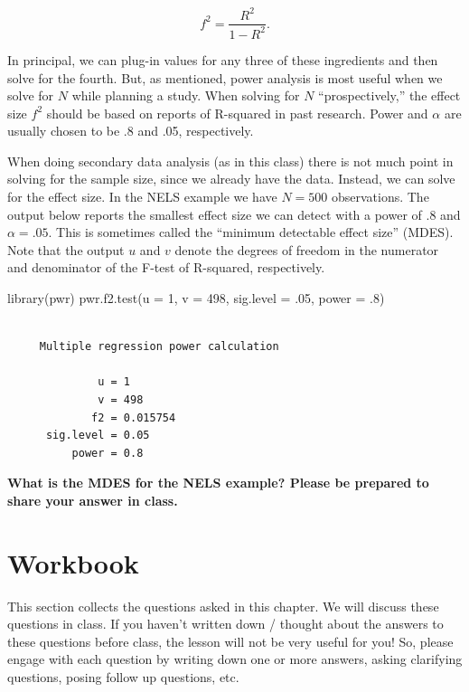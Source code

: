 \documentclass[
  letterpaper,
  DIV=11,
  numbers=noendperiod]{scrreprt}
\newenvironment{Shaded}{\begin{snugshade}}{\end{snugshade}}
\newcommand{\AttributeTok}[1]{\textcolor[rgb]{0.40,0.45,0.13}{#1}}
\newcommand{\DecValTok}[1]{\textcolor[rgb]{0.68,0.00,0.00}{#1}}
\newcommand{\FunctionTok}[1]{\textcolor[rgb]{0.28,0.35,0.67}{#1}}
\newcommand{\NormalTok}[1]{\textcolor[rgb]{0.00,0.23,0.31}{#1}}
\begin{document}
\[ f^2 = {\frac{R^2}{1-R^2}}. \]

In principal, we can plug-in values for any three of these ingredients
and then solve for the fourth. But, as mentioned, power analysis is most
useful when we solve for \(N\) while planning a study. When solving for
\(N\) ``prospectively,'' the effect size \(f^2\) should be based on
reports of R-squared in past research. Power and \(\alpha\) are usually
chosen to be .8 and .05, respectively.

When doing secondary data analysis (as in this class) there is not much
point in solving for the sample size, since we already have the data.
Instead, we can solve for the effect size. In the NELS example we have
\(N=500\) observations. The output below reports the smallest effect
size we can detect with a power of .8 and \(\alpha = .05\). This is
sometimes called the ``minimum detectable effect size'' (MDES). Note
that the output \(u\) and \(v\) denote the degrees of freedom in the
numerator and denominator of the F-test of R-squared, respectively.

\begin{Shaded}
\begin{Highlighting}[]
\FunctionTok{library}\NormalTok{(pwr)}
\FunctionTok{pwr.f2.test}\NormalTok{(}\AttributeTok{u =} \DecValTok{1}\NormalTok{, }\AttributeTok{v =} \DecValTok{498}\NormalTok{, }\AttributeTok{sig.level =}\NormalTok{ .}\DecValTok{05}\NormalTok{, }\AttributeTok{power =}\NormalTok{ .}\DecValTok{8}\NormalTok{)}
\end{Highlighting}
\end{Shaded}

\begin{verbatim}

     Multiple regression power calculation 

              u = 1
              v = 498
             f2 = 0.015754
      sig.level = 0.05
          power = 0.8
\end{verbatim}

\textbf{What is the MDES for the NELS example? Please be prepared to
share your answer in class.}

\hypertarget{workbook-2}{%
\section{Workbook}\label{workbook-2}}

This section collects the questions asked in this chapter. We will
discuss these questions in class. If you haven't written down / thought
about the answers to these questions before class, the lesson will not
be very useful for you! So, please engage with each question by writing
down one or more answers, asking clarifying questions, posing follow up
questions, etc.
\end{document}
